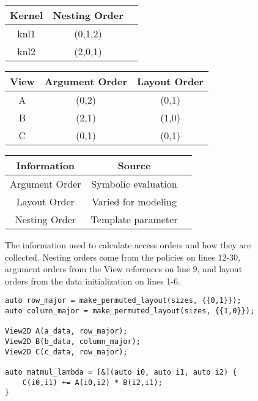 \begin{figure*}

	\begin{subfigure}{0.9\textwidth}
		\begin{center}
			\begin{tabular} {|c|c|c|}
				\hline
				Kernel & Nesting Order \\ \hline
				knl1 & (0,1,2) \\
				knl2 & (2,0,1) \\
				\hline
			\end{tabular}
			\hspace{0.01\textwidth}
			\begin{tabular} {|c|c|c|}
				\hline 
				View & Argument Order & Layout Order \\  \hline 
				A & (0,2) & (0,1) \\ 
				B & (2,1) & (1,0) \\
				C & (0,1) & (0,1) \\
				\hline
			\end{tabular}
			\hspace{0.01\textwidth}
			\begin{tabular} {|c|c|c|}
				\hline
				Information & Source \\ \hline 
				Argument Order & Symbolic evaluation  \\
				Layout Order & Varied for modeling\\
				Nesting Order & Template parameter \\
				\hline
			\end{tabular}
		\end{center}
		\caption{The information used to calculate access orders and how they are collected. Nesting orders come from the policies on lines 12-30, argument orders from the View references on line 9, and layout orders from the data initialization on lines 1-6.}
		\label{accessOrder:orders}
	\end{subfigure}

	\vspace{10px}

	\begin{subfigure}[b]{0.40\textwidth}
		\begin{lstlisting}
auto row_major = make_permuted_layout(sizes, {{0,1}});
auto column_major = make_permuted_layout(sizes, {{1,0}});

View2D A(a_data, row_major); 
View2D B(b_data, column_major); 
View2D C(c_data, row_major);

auto matmul_lambda = [&](auto i0, auto i1, auto i2) {
	C(i0,i1) += A(i0,i2) * B(i2,i1);
}


\end{lstlisting}
\end{subfigure}
\end{figure*}

